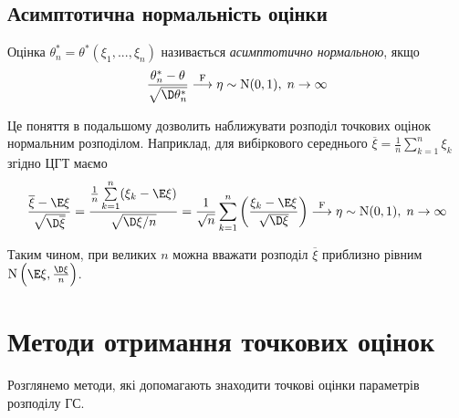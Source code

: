 \subsection{Асимптотична нормальність оцінки}
\begin{definition}
    Оцінка $\theta_n^* = \theta^* (\xi_1, ..., \xi_n)$ називається \emph{асимптотично нормальною}, якщо 
    \begin{gather}
        \frac{\theta_n^* - \theta}{\sqrt{\D\theta_n^*}} \overset{\mathrm{F}}{\longrightarrow} \eta \sim \mathrm{N}(0, 1), \; n \to \infty
    \end{gather}
\end{definition}
Це поняття в подальшому дозволить наближувати розподіл точкових оцінок нормальним розподілом.
Наприклад, для вибіркового середнього $\overline{\xi} = \frac{1}{n} \sum\limits_{k=1}^n \xi_k$ згідно ЦГТ маємо
$$ 
\frac{\overline{\xi} - \E\xi}{\sqrt{\D\overline{\xi}}} = \frac{\frac{1}{n} \sum\limits_{k=1}^n (\xi_k  -\E\xi)}{\sqrt{\D\xi/n}} = 
\frac{1}{\sqrt{n}} \sum\limits_{k=1}^n \left(\frac{\xi_k - \E\xi}{\sqrt{\D\xi}} \right)
\overset{\mathrm{F}}{\longrightarrow} \eta \sim \mathrm{N}(0, 1), \; n \to \infty
$$

Таким чином, при великих $n$ можна вважати розподіл $\overline{\xi}$ приблизно рівним $ \mathrm{N} \left(\E\xi, \frac{\D\xi}{n}\right)$.

\section{Методи отримання точкових оцінок}
Розглянемо  методи, які допомагають знаходити точкові оцінки параметрів розподілу ГС.
